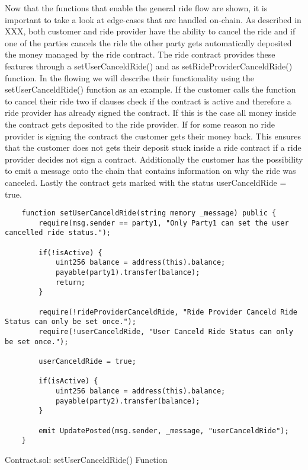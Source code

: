 Now that the functions that enable the general ride flow are shown, it is important to take a look at edge-cases that are handled on-chain. As described in XXX, both customer and ride provider have the ability to cancel the ride and if one of the parties cancels the ride the other party gets automatically deposited the money managed by the ride contract. The ride contract provides these features through a setUserCanceldRide() and as setRideProviderCanceldRide() function. In the flowing we will describe their functionality using the setUserCanceldRide() function as an example. If the customer calls the function to cancel their ride two if clauses check if the contract is active and therefore a ride provider has already signed the contract. If this is the case all money inside the contract gets deposited to the ride provider. If for some reason no ride provider is signing the contract the customer gets their money back. This ensures that the customer does not gets their deposit stuck inside a ride contract if a ride provider decides not sign a contract. Additionally the customer has the possibility to emit a message onto the chain that contains information on why the ride was canceled.
Lastly the contract gets marked with the status userCanceldRide = true.

\lstset{
  basicstyle=\footnotesize\ttfamily,
  breaklines=true,
  numbers=left,
  firstnumber=176
}

\begin{Listing}
\begin{lstlisting}
    function setUserCanceldRide(string memory _message) public {
        require(msg.sender == party1, "Only Party1 can set the user cancelled ride status.");
        
        if(!isActive) {
            uint256 balance = address(this).balance;
            payable(party1).transfer(balance);
            return;
        }

        require(!rideProviderCanceldRide, "Ride Provider Canceld Ride Status can only be set once.");
        require(!userCanceldRide, "User Canceld Ride Status can only be set once.");

        userCanceldRide = true;
        
        if(isActive) {
            uint256 balance = address(this).balance;
            payable(party2).transfer(balance);
        }
        
        emit UpdatePosted(msg.sender, _message, "userCanceldRide");
    }
\end{lstlisting}
  \caption{Contract.sol: setUserCanceldRide() Function}
  \label{lst:setUserCanceldRide}
\end{Listing}

